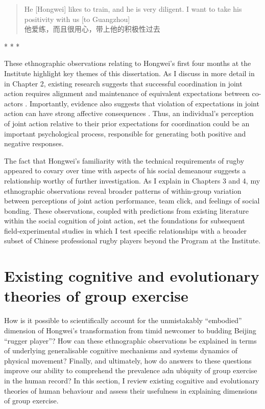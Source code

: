 \begin{CJK}{UTF8}{gbsn}
  \begin{quotation}
He [Hongwei] likes to train, and he is very diligent. I want to take his positivity with us [to Guangzhou] \\
他爱练，而且很用心，带上他的积极性过去
  \end{quotation}
\end{CJK}

\begin{center}
  * * *
\end{center}


These ethnographic observations relating to Hongwei's first four months at the Institute highlight key themes of this dissertation.  As I discuss in more detail in in Chapter 2, existing research suggests that successful coordination in joint action requires alignment and maintenance of equivalent expectations between co-actors \citep{Sebanz2006,Vesper2017,Pesquita2017}.  Importantly, evidence also suggests that violation of expectations in joint action can have strong affective consequences \citep{Chetverikov2016}.  Thus, an individual's perception of joint action relative to their prior expectations for coordination could be an important psychological process, responsible for generating both positive and negative responses.

The fact that Hongwei's familiarity with the technical requirements of rugby appeared to covary over time with aspects of his social demeanour suggests a relationship worthy of further investigation.  As I explain in Chapters 3 and 4, my ethnographic observations reveal broader patterns of within-group variation between perceptions of joint action performance, team click, and feelings of social bonding.  These observations, coupled with predictions from existing literature within the social cognition of joint action, set the foundations for subsequent field-experimental studies in which I test specific relationships with a broader subset of Chinese professional rugby players beyond the Program at the Institute.


\section{Existing cognitive and evolutionary theories of group exercise}
How is it possible to scientifically account for the unmistakably ``embodied'' dimension of Hongwei's transformation from timid newcomer to budding Beijing ``rugger player''? How can these ethnographic observations be explained in terms of underlying generalisable cognitive mechanisms and systems dynamics of physical movement?  Finally, and ultimately, how do answers to these questions improve our ability to comprehend the prevalence adn ubiquity of group exercise in the human record?  In this section, I review existing cognitive and evolutionary theories of human behaviour and assess their usefulness in explaining dimensions of group exercise.

